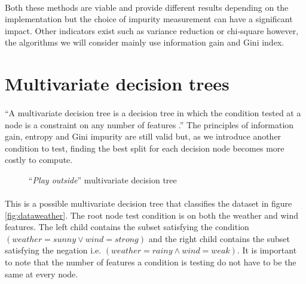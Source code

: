 \documentclass[12pt]{report}
\theoremstyle{definition}
\theoremstyle{definition}
\theoremstyle{definition}
\begin{document}
\paragraph{} Both these methods are viable and provide different results depending on the implementation but
the choice of impurity measurement can have a significant impact. Other indicators exist such as variance 
reduction or chi-square however, the algorithms we will consider mainly use information gain and Gini index.


\section{Multivariate decision trees}
\paragraph{} ``A multivariate decision tree is a decision tree in which the condition tested at a node is a 
constraint on any number of features \cite{multivariate-explaining}.'' The principles of information gain,
entropy and Gini impurity are still valid but, as we introduce another condition to test, finding the best
split for each decision node becomes more costly to compute.

\begin{figure}[ht]
    \centering
    \caption{``\textit{Play outside}'' multivariate decision tree}
    \label{fig:multitree}
\end{figure}

\paragraph{} This is a possible multivariate decision tree that classifies the dataset in figure \ref{fig:dataweather}.
The root node test condition is on both the weather and wind features. The left child contains the subset
satisfying the condition $(weather=sunny \lor wind=strong)$ and the right child contains the subset satisfying
the negation i.e. $(weather=rainy \land wind=weak)$. It is important to note that the number of features a
condition is testing do not have to be the same at every node.
\end{document}
